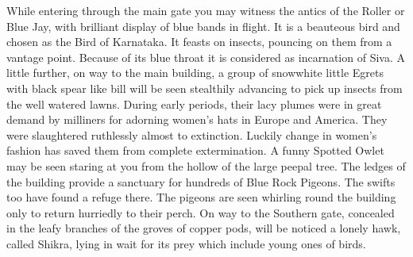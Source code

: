 \medskip
{}
While entering through the main gate you may witness the antics of 
the Roller or Blue Jay, with brilliant display of blue bands in flight. It is a 
beauteous bird and chosen as the Bird of Karnataka. It feasts on insects, 
pouncing on them from a vantage point. Because of its blue throat it is 
considered as incarnation of Siva. A little further, on way to the main 
building, a group of snowwhite little Egrets with black spear like bill will be 
seen stealthily advancing to pick up insects from the well watered lawns. 
During early periods, their lacy plumes were in great demand by milliners 
for adorning women's hats in Europe and America. They were slaughtered 
ruthlessly almost to extinction. Luckily change in women's fashion has 
saved them from complete extermination. A funny Spotted Owlet may be 
seen staring at you from the hollow of the large peepal tree. The ledges of 
the building provide a sanctuary for hundreds of Blue Rock Pigeons. The 
swifts too have found a refuge there. The pigeons are seen whirling round 
the building only to return hurriedly to their perch. On way to the Southern 
gate, concealed in the leafy branches of the groves of copper pods, will be 
noticed a lonely hawk, called Shikra, lying in wait for its prey which include 
young ones of birds. 

\newpage


